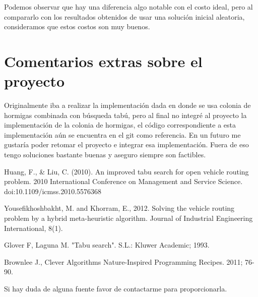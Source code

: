 \documentclass{article}
\begin{document}
Podemos observar que hay una diferencia algo notable con el costo ideal, pero al compararlo con los resultados obtenidos de usar una solución inicial aleatoria, consideramos que estos costos son muy buenos. 

\section{Comentarios extras sobre el proyecto}
Originalmente iba a realizar la implementación dada en \cite{hybrid} donde se usa colonia de hormigas combinada con búsqueda tabú, pero al final no integré al proyecto la implementación de la colonia de hormigas, el código correspondiente a esta implementación aún se encuentra en el git como referencia. En un futuro me gustaría poder retomar el proyecto e integrar esa implementación.
Fuera de eso tengo soluciones bastante buenas y aseguro siempre son factibles.

\begin{thebibliography}{9}
	Huang, F., \& Liu, C. (2010). An improved tabu search for open vehicle routing problem. 2010 International Conference on Management and Service Science. doi:10.1109/icmss.2010.5576368
	
	Yousefikhoshbakht, M. and Khorram, E., 2012. Solving the vehicle routing problem by a hybrid meta-heuristic algorithm. Journal of Industrial Engineering International, 8(1).
	
	Glover F, Laguna M. "Tabu search". S.L.: Kluwer Academic; 1993.  
	
	Brownlee J., Clever Algorithms Nature-Inspired Programming Recipes. 2011; 76-90.
\end{thebibliography}

Si hay duda de alguna fuente favor de contactarme para proporcionarla.
\end{document}
